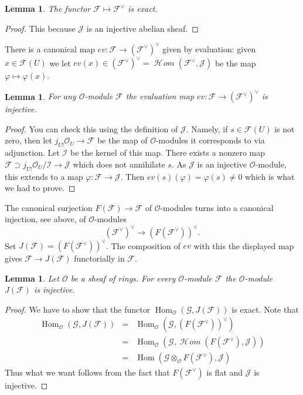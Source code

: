 \documentclass{stacks-project}
\theoremstyle{plain}
\newtheorem{lemma}[subsection]{Lemma}
\theoremstyle{definition}
\theoremstyle{remark}
\numberwithin{equation}{subsection}
\def\Hom{\mathop{\mathrm{Hom}}\nolimits}
\def\SheafHom{\mathop{\mathcal{H}\!\mathit{om}}\nolimits}
\begin{document}
\begin{lemma}
\label{lemma-vee-exact-sheaves}
The functor $\mathcal{F} \mapsto \mathcal{F}^\vee$ is exact.
\end{lemma}

\begin{proof}
This because $\mathcal{J}$ is an injective abelian sheaf.
\end{proof}

\noindent
There is a canonical map $ev : \mathcal{F} \to (\mathcal{F}^\vee)^\vee$
given by evaluation: given $x \in \mathcal{F}(U)$ we let
$ev(x) \in (\mathcal{F}^\vee)^\vee =
\SheafHom(\mathcal{F}^\vee, \mathcal{J})$
be the map $\varphi \mapsto \varphi(x)$.

\begin{lemma}
\label{lemma-ev-injective-sheaves}
For any $\mathcal{O}$-module $\mathcal{F}$ the evaluation map
$ev : \mathcal{F} \to (\mathcal{F}^\vee)^\vee$ is injective.
\end{lemma}

\begin{proof}
You can check this using the definition of $\mathcal{J}$.
Namely, if $s \in \mathcal{F}(U)$ is not zero, then let
$j_{U!}\mathcal{O}_U \to \mathcal{F}$ be the map of
$\mathcal{O}$-modules it corresponds to via adjunction.
Let $\mathcal{I}$ be the kernel of this map. There exists
a nonzero map $\mathcal{F} \supset j_{U!}\mathcal{O}_U/\mathcal{I}
\to \mathcal{J}$ which does not annihilate $s$. As $\mathcal{J}$ is
an injective $\mathcal{O}$-module, this extends to a map
$\varphi : \mathcal{F} \to \mathcal{J}$.
Then $ev(s)(\varphi) = \varphi(s) \not = 0$ which is what we had to prove.
\end{proof}

\noindent
The canonical surjection
$F(\mathcal{F}) \to \mathcal{F}$ of $\mathcal{O}$-modules turns into a
canonical injection, see above, of $\mathcal{O}$-modules
$$
(\mathcal{F}^\vee)^\vee \longrightarrow (F(\mathcal{F}^\vee))^\vee.
$$
Set $J(\mathcal{F}) = (F(\mathcal{F}^\vee))^\vee$.
The composition of $ev$ with this
the displayed map gives
$\mathcal{F} \to J(\mathcal{F})$ functorially in $\mathcal{F}$.

\begin{lemma}
\label{lemma-JM-injective-sheaves}
Let $\mathcal{O}$ be a sheaf of rings.
For every $\mathcal{O}$-module $\mathcal{F}$ the
$\mathcal{O}$-module $J(\mathcal{F})$ is injective.
\end{lemma}

\begin{proof}
We have to show that the functor
$\Hom_\mathcal{O}(\mathcal{G}, J(\mathcal{F}))$
is exact. Note that
\begin{eqnarray*}
\Hom_\mathcal{O}(\mathcal{G}, J(\mathcal{F}))
& = &
\Hom_\mathcal{O}(\mathcal{G}, (F(\mathcal{F}^\vee))^\vee) \\
& = &
\Hom_\mathcal{O}
(\mathcal{G}, \SheafHom(F(\mathcal{F}^\vee), \mathcal{J})) \\
& = &
\Hom(\mathcal{G} \otimes_\mathcal{O} F(\mathcal{F}^\vee), \mathcal{J})
\end{eqnarray*}
Thus what we want follows from the fact that $F(\mathcal{F}^\vee)$
is flat and $\mathcal{J}$ is injective.
\end{proof}
\end{document}
